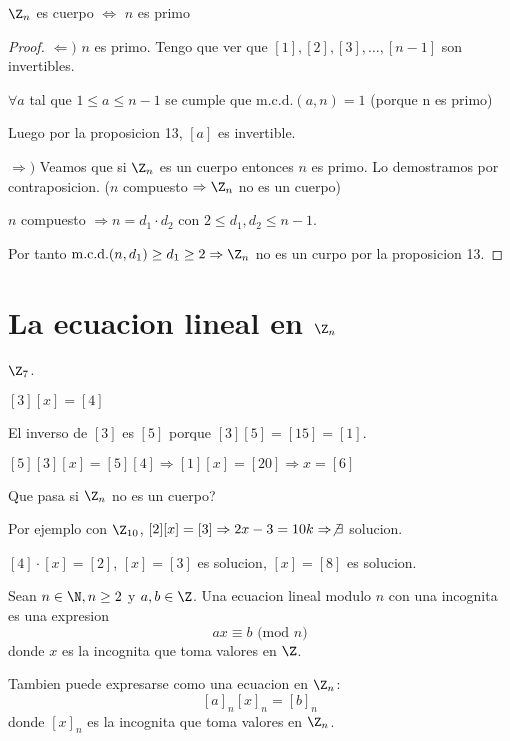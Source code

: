 \begin{proposition}
	\(\Z_n \) es cuerpo \(\iff  \) \(n \) es primo
\end{proposition}

\begin{proof}
	\(\Leftarrow ) \) \(n \) es primo. Tengo que ver que \([1],[2],[3],\ldots,[n-1 ]\) son invertibles.

	\(\forall  a \) tal que \(1 \leq a \leq n - 1 \) se cumple que \(\mathrm{m.c.d.}(a,n) = 1 \) (porque n es primo)

	Luego por la proposicion 13, \([a ]\) es invertible.

	\(\Rightarrow ) \) Veamos que si \(\Z_n \) es un cuerpo entonces \(n \) es primo. Lo demostramos por contraposicion. (\(n \) compuesto \(\Rightarrow \Z_n \) no es un cuerpo)

	\(n \) compuesto \(\Rightarrow n = d_1 \cdot d_2 \) con \(2 \leq d_1, d_2 \leq n - 1\).

	Por tanto \(\mathrm{m.c.d.}(n,d_1) \geq d_1 \geq 2 \Rightarrow \Z_n \) no es un curpo por la proposicion 13.
\end{proof}

\section{La ecuacion lineal en \(\Z_n \)}
\begin{example}
	\(\Z_7 \).

	\([3][x] = [4]\)

	El inverso de \([3]\) es \([5]\) porque \([3][5] = [15] = [1]\).

	\([5][3][x] = [5][4] \Rightarrow [1][x] = [20] \Rightarrow x = [6]\)
\end{example}
\begin{remark}
	Que pasa si \(\Z_n \) no es un cuerpo?

	Por ejemplo con \(\Z_{10 }\), \([2][x]=[3] \Rightarrow 2x - 3 = 10k \Rightarrow \not \exists \) solucion.

	\([4] \cdot [x] = [2]\), \([x]  = [3 ]\) es solucion, \([x] = [8 ]\) es solucion.
\end{remark}

\begin{definition}
	Sean \(n \in \N, n \geq 2 \) y \(a,b \in \Z \). Una ecuacion lineal modulo \( n \) con una incognita es una expresion
	\[
		ax \equiv b \text{ (mod }  n)
	\]
	donde \(x \) es la incognita que toma valores en \(\Z \).

	Tambien puede expresarse como una ecuacion en \(\Z_n \):
	\[
		[a]_n [x]_n = [b]_n
	\]
	donde \([x]_n \) es la incognita que toma valores en \(\Z_n \).
\end{definition}

